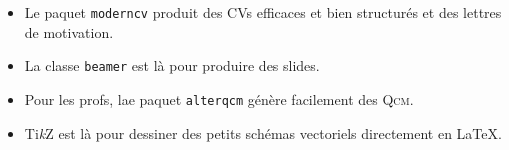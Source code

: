 \begin{itemize}
\item Le paquet \texttt{moderncv} produit des CVs efficaces et bien structurés et des lettres de motivation.
\item La classe \texttt{beamer} est là pour produire des slides.
\item Pour les profs, lae paquet \texttt{alterqcm} génère facilement des \textsc{Qcm}.
\item Ti\textit{k}Z est là pour dessiner des petits schémas vectoriels directement en \LaTeX{}.
\end{itemize}


	
